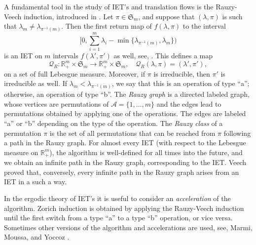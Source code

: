 \documentclass[JEP,XML,SOM,Unicode]{cedram}
\let\mathcal\mathscr
\newcommand{\sep}{:}
\theoremstyle{plain}
\theoremstyle{definition}
\let\lam\lambda
\newcommand\Frs{\mathfrak{S}}
\newcommand\Ak{\mathcal{A}}
\newcommand\Qk{\mathcal{Q}}
\newcommand{\R}{\mathbb{R}}
\begin{document}
 \label{subsec-Rauzy}
A fundamental tool in the study of IET's and translation flows is the Rauzy-Veech induction, introduced in \cite{Veech0,Rauzy}.
Let $\pi\in \Frs_m$, and suppose that $(\lam,\pi)$ is such that $\lam_m \ne \lam_{\pi^{-1}(m)}$. Then the first return map of $f(\lam,\pi)$ to the interval
\[\textstyle
\bigl[0, \sum_{i=1}^m \lam_i - \min\{\lam_{\pi^{-1}(m)},\lam_m\} \bigr)
\]
is an IET on $m$ intervals $f(\lam',\pi')$ as well, see, \eg \cite{viana2,yoccoz}. This defines a map
\[
\Qk_R\sep \R^m_+\times \Frs_m \to \R^m_+\times \Frs_m,\quad \Qk_R(\lam,\pi) = (\lam',\pi'),
\]
on a set of full Lebesgue measure. Moreover, if $\pi$ is irreducible, then $\pi'$ is irreducible as well.
If $\lam_m < \lam_{\pi^{-1}(m)}$, we say that this is an operation of type ``a''; otherwise, an operation of type ``b''. The \emph{Rauzy graph} is a directed labeled graph, whose vertices are permutations of $\Ak=\{1,\ldots,m\}$ and the edges lead to permutations obtained by applying one of the operations. The edges are labeled ``a'' or ``b'' depending on the type of the operation. The \emph{Rauzy class} of a permutation $\pi$ is the set of all permutations that can be reached from $\pi$ following a path in the Rauzy graph. For almost every IET (with respect to the Lebesgue measure on $\R^m_+$), the algorithm is well-defined for all times into the future, and we obtain an infinite path in the Rauzy graph, corresponding to the IET. Veech \cite{veech} proved that, conversely, every infinite path in the Rauzy graph arises from an IET in a such a way.

In the ergodic theory of IET's it is useful to consider an \emph{acceleration} of the algorithm. Zorich induction \cite{Zorich,Zorich1} is obtained by applying the Rauzy-Veech induction until the first switch from a type ``a'' to a type ``b'' operation, or vice versa.
Sometimes other versions of the algorithm and accelerations are used, see, \eg Marmi, Moussa, and Yoccoz \cite{MMY}.
\end{document}
